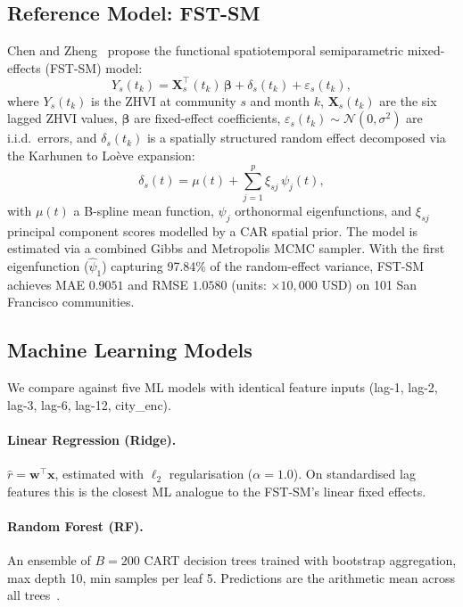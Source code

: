 \documentclass[runningheads]{llncs}
\begin{document}
\subsection{Reference Model: FST-SM}

Chen and Zheng~\cite{ref_fmem2023} propose the functional
spatiotemporal semiparametric mixed-effects (FST-SM) model:
\begin{equation}
  Y_s(t_k) = \mathbf{X}_s^\top(t_k)\,\boldsymbol{\beta}
             + \delta_s(t_k) + \varepsilon_s(t_k),
  \label{eq:fstsm}
\end{equation}
where $Y_s(t_k)$ is the ZHVI at community $s$ and month $k$,
$\mathbf{X}_s(t_k)$ are the six lagged ZHVI values,
$\boldsymbol{\beta}$ are fixed-effect coefficients,
$\varepsilon_s(t_k) \sim \mathcal{N}(0,\sigma^2)$ are i.i.d.\
errors, and $\delta_s(t_k)$ is a spatially structured random
effect decomposed via the Karhunen to Loève expansion:
\begin{equation}
  \delta_s(t) = \mu(t) + \sum_{j=1}^{p} \xi_{sj}\,\psi_j(t),
  \label{eq:kl}
\end{equation}
with $\mu(t)$ a B-spline mean function, $\psi_j$ orthonormal
eigenfunctions, and $\xi_{sj}$ principal component scores modelled
by a CAR spatial prior. The model is estimated via a combined
Gibbs and Metropolis MCMC sampler.
With the first eigenfunction ($\hat\psi_1$) capturing 97.84\% of
the random-effect variance, FST-SM achieves MAE $0.9051$ and
RMSE $1.0580$ (units: $\times 10{,}000$ USD) on 101 San Francisco
communities.

\subsection{Machine Learning Models}

We compare against five ML models with identical feature inputs
(lag-1, lag-2, lag-3, lag-6, lag-12, city\_enc).

\paragraph{Linear Regression (Ridge).}
$\hat{r} = \boldsymbol{w}^\top \mathbf{x}$, estimated with
$\ell_2$ regularisation ($\alpha=1.0$). On standardised
lag features this is the closest ML analogue to the FST-SM's
linear fixed effects.

\paragraph{Random Forest (RF).}
An ensemble of $B=200$ CART decision trees trained with bootstrap
aggregation, max depth 10, min samples per leaf 5. Predictions
are the arithmetic mean across all trees~\cite{ref_breiman}.
\end{document}
